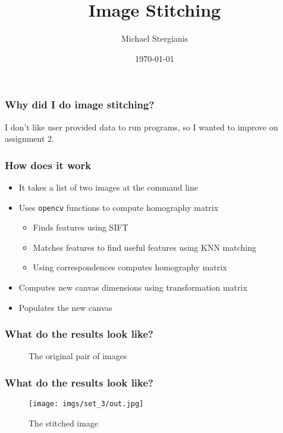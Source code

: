 \documentclass{beamer}
\title{Image Stitching}
\author{Michael Stergianis}
\institute{University of Ontario Institute of Technology}
\date{\today}
\begin{document}
\frame{\titlepage}
\begin{frame}
  \frametitle{Why did I do image stitching?}
  I don't like user provided data to run programs, so I wanted to
  improve on assignment 2.
\end{frame}
\begin{frame}
  \frametitle{How does it work}
  \begin{itemize}
    \item It takes a list of two images at the command line
    \item Uses \texttt{opencv} functions to compute homography matrix
    \begin{itemize}
      \item Finds features using SIFT
      \item Matches features to find useful features using KNN matching
      \item Using correspondences computes homography matrix
    \end{itemize}
    \item Computes new canvas dimensions using transformation matrix
    \item Populates the new canvas
  \end{itemize}
\end{frame}
\begin{frame}
  \frametitle{What do the results look like?}
  \begin{figure}[ht]
    \centering
    \caption{The original pair of images}
    \label{fig:pair}
  \end{figure}
\end{frame}
\begin{frame}
  \frametitle{What do the results look like?}
  \begin{figure}[ht]
    \centering
    \texttt{[image: imgs/set\_3/out.jpg]}
    \caption{\label{fig:label} The stitched image}
  \end{figure}

\end{frame}
\end{document}
